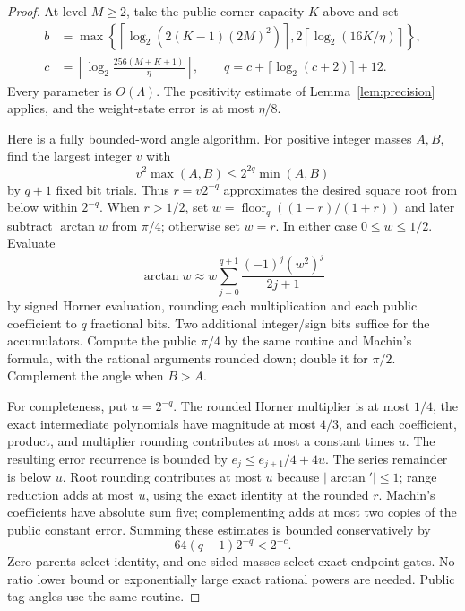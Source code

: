 \documentclass[11pt]{article}
\theoremstyle{definition}
\DeclareMathOperator{\atan}{arctan}
\begin{document}
\begin{proof}
At level $M\ge2$, take the public corner capacity $K$ above and set
\begin{align*}
 b&=\max\left\{\left\lceil\log_2(2(K-1)(2M)^2)\right\rceil,
           2\left\lceil\log_2(16K/\eta)\right\rceil\right\},\\
 c&=\left\lceil\log_2\frac{256(M+K+1)}\eta\right\rceil,\qquad
 q=c+\lceil\log_2(c+2)\rceil+12.
\end{align*}
Every parameter is $O(\Lambda)$. The positivity estimate of
Lemma~\ref{lem:precision} applies, and the weight-state error is at most
$\eta/8$.

Here is a fully bounded-word angle algorithm. For positive integer masses
$A,B$, find the largest integer $v$ with
\[
 v^2\max(A,B)\le 2^{2q}\min(A,B)
\]
by $q+1$ fixed bit trials. Thus $r=v2^{-q}$ approximates the desired
square root from below within $2^{-q}$. When $r>1/2$, set
$w=\operatorname{floor}_q((1-r)/(1+r))$ and later subtract
$\atan w$ from $\pi/4$; otherwise set $w=r$. In either case
$0\le w\le1/2$. Evaluate
\[
 \atan w\approx w\sum_{j=0}^{q+1}\frac{(-1)^j(w^2)^j}{2j+1}
\]
by signed Horner evaluation, rounding each multiplication and each public
coefficient to $q$ fractional bits. Two additional integer/sign bits
suffice for the accumulators. Compute the public $\pi/4$ by the same
routine and Machin's formula, with the rational arguments rounded down;
double it for $\pi/2$. Complement the angle when $B>A$.

For completeness, put $u=2^{-q}$. The rounded Horner multiplier is at
most $1/4$, the exact intermediate polynomials have magnitude at most
$4/3$, and each coefficient, product, and multiplier rounding contributes
at most a constant times $u$. The resulting error recurrence is bounded
by $e_j\le e_{j+1}/4+4u$. The series remainder is below $u$.
Root rounding contributes at most $u$ because $|\atan'|\le1$; range
reduction adds at most $u$, using the exact identity at the rounded $r$.
Machin's coefficients have absolute sum five; complementing adds at most
two copies of the public constant error. Summing these estimates is
bounded conservatively by
\[
 64(q+1)2^{-q}<2^{-c}.
\]
Zero parents select identity, and one-sided masses select exact endpoint
gates. No ratio lower bound or exponentially large exact rational powers
are needed. Public tag angles use the same routine.


\end{proof}
\end{document}
